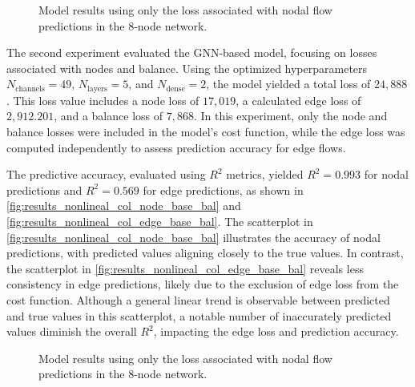 \begin{figure}
    \centering
    \setlength{}        
    \setlength{} 
    
    \caption{Model results using only the loss associated with nodal flow predictions in the 8-node network.}
    \label{fig:col_base_f_results_non_lineal}
\end{figure}


The second experiment evaluated the GNN-based model, focusing on losses associated with nodes and balance. Using the optimized hyperparameters \( N_{\text{channels}} = 49 \), \( N_{\text{layers}} = 5 \), and \( N_{\text{dense}} = 2 \), the model yielded a total loss of \( 24,888 \). This loss value includes a node loss of \( 17,019 \), a calculated edge loss of \( 2,912.201 \), and a balance loss of \( 7,868 \). In this experiment, only the node and balance losses were included in the model's cost function, while the edge loss was computed independently to assess prediction accuracy for edge flows.

The predictive accuracy, evaluated using \( R^2 \) metrics, yielded \( R^2 = 0.993 \) for nodal predictions and \( R^2 = 0.569 \) for edge predictions, as shown in \cref{fig:results_nonlineal_col_node_base_bal} and \cref{fig:results_nonlineal_col_edge_base_bal}. The scatterplot in \cref{fig:results_nonlineal_col_node_base_bal} illustrates the accuracy of nodal predictions, with predicted values aligning closely to the true values. In contrast, the scatterplot in \cref{fig:results_nonlineal_col_edge_base_bal} reveals less consistency in edge predictions, likely due to the exclusion of edge loss from the cost function. Although a general linear trend is observable between predicted and true values in this scatterplot, a notable number of inaccurately predicted values diminish the overall \( R^2 \), impacting the edge loss and prediction accuracy.




\begin{figure}
    \centering
    \setlength{}        
    \setlength{} 
    
    \caption{Model results using only the loss associated with nodal flow predictions in the 8-node network.}
    \label{fig:col_base_bal_results_non_lineal}
\end{figure}




